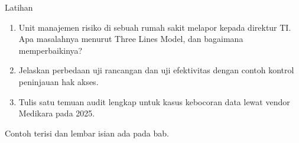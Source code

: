 \documentclass[aspectratio=169, table, 12pt]{beamer}
\begin{document}
\begin{frame}{{\Large Latihan}}
  \vspace{6pt}
  \small
  \begin{enumerate}
    \item Unit manajemen risiko di sebuah rumah sakit melapor kepada direktur TI. Apa masalahnya
          menurut Three Lines Model, dan bagaimana memperbaikinya?
    \item Jelaskan perbedaan uji rancangan dan uji efektivitas dengan contoh kontrol peninjauan hak
          akses.
    \item Tulis satu temuan audit lengkap untuk kasus kebocoran data lewat vendor Medikara pada
          2025.
  \end{enumerate}

  \vspace{4pt}
  \scriptsize Contoh terisi dan lembar isian ada pada bab.
\end{frame}
\end{document}
